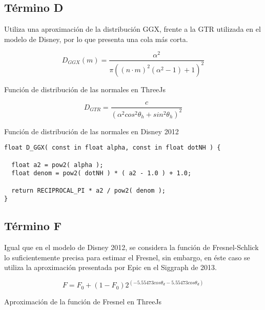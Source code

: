   \subsection*{T\'ermino D}
  Utiliza una aproximaci\'on de la distribuci\'on GGX, frente a la GTR utilizada en el modelo de Disney, por lo que
  presenta una cola m\'as corta.\\

  \begin{eqfloat}
    \begin{equation}
      D_{GGX}(m) = \frac{\alpha^2}{\pi((n\cdotp{m})^2(\alpha^2 - 1 ) + 1)^2}
    \end{equation}
  \caption{Funci\'on de distribuci\'on de las normales en ThreeJs}
  \end{eqfloat}
  \singlespacing

  \begin{eqfloat}
    \begin{equation}
      D_{GTR} = \frac
      {c}
      {(\alpha^2 cos^2 \theta_h + sin^2 \theta_h)^2}
    \end{equation}
  \caption{Funci\'on de distribuci\'on de las normales en Disney 2012}
  \end{eqfloat}
  \singlespacing

  \begin{lstlisting}[caption=Implementaci\'on en ThreeJs del t\'ermino de geometr\'ia]
float D_GGX( const in float alpha, const in float dotNH ) {

  float a2 = pow2( alpha );
  float denom = pow2( dotNH ) * ( a2 - 1.0 ) + 1.0;

  return RECIPROCAL_PI * a2 / pow2( denom );
}
  \end{lstlisting}
  \singlespacing

  \subsection*{T\'ermino F}
  Igual que en el modelo de Disney 2012, se considera la funci\'on de Fresnel-Schlick lo suficientemente precisa para
  estimar el Fresnel, sin embargo, en \'este caso se utiliza la aproximaci\'on presentada por Epic en el Siggraph de 2013.\\

  \begin{eqfloat}
    \begin{equation}
      F= F_0 + (1 - F_0)2^{(-5.55473cos\theta_d - 5.55473cos\theta_d)}
    \end{equation}
  \caption{Aproximaci\'on de la funci\'on de Fresnel en ThreeJs}
  \end{eqfloat}

